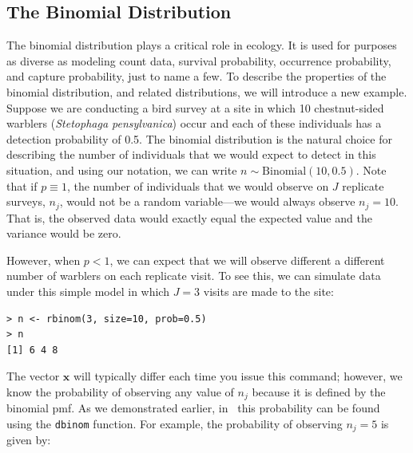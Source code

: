 \subsection{The Binomial Distribution}

The binomial distribution plays a critical role in ecology. It is
used for purposes as diverse as modeling count data, survival
probability, occurrence probability, and capture probability, just to
name a few.
To describe the properties of the binomial distribution, and related
distributions, we will introduce a new example.
Suppose we are conducting a bird survey at a site in which 10
chestnut-sided warblers (\textit{Stetophaga pensylvanica}) occur and
each of these individuals has a detection probability of 0.5. The
binomial distribution is the natural choice for describing the number
of individuals that we would expect to detect in this
situation, and using our notation, we can write
$n \sim \text{Binomial}(10, 0.5)$. Note that if $p \equiv 1$, the number of
individuals that we would observe on $J$ replicate surveys, $n_j$,
would not be a random variable---we would always observe
$n_j=10$. That is, the observed data would exactly equal the expected
value and the variance would be zero.

However, when $p<1$, we can expect that we will observe different
a different number of warblers on each replicate visit. To see this,
we can simulate data under this simple model in which $J=3$ visits are
made to the site:
\begin{verbatim}
> n <- rbinom(3, size=10, prob=0.5)
> n
[1] 6 4 8
\end{verbatim}
The vector $\mathbf{x}$ will typically differ each time you issue this
command; however, we know the probability of observing any value of
$n_j$ because it is defined by the binomial pmf. As we demonstrated
earlier, in \R~this probability can be found using the \verb+dbinom+
function. For example, the probability of observing $n_j=5$ is given by:

